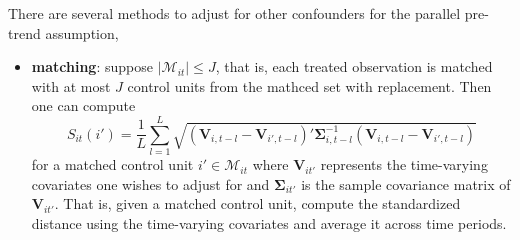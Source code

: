 \documentclass[twoside]{article}
\begin{document}
There are several methods to adjust for other confounders for the parallel pre-trend assumption,
\begin{itemize}
    \item \textbf{matching}: suppose $\left\vert \mathcal{M}_{it} \right\vert \leq J$, that is, each treated observation is matched with at most $J$ control units from the mathced set with replacement. Then one can compute
    \begin{equation*}
        S_{it}\left(i'\right) = \frac{1}{L} \sum^L_{l=1}\sqrt{ \left( \mathbf{V}_{i,t-l}-\mathbf{V}_{i',t-l}\right)'\boldsymbol{\Sigma}^{-1}_{i,t-l} \left( \mathbf{V}_{i,t-l}-\mathbf{V}_{i',t-l} \right) }
    \end{equation*}
    for a matched control unit $i'\in \mathcal{M}_{it}$ where $\mathbf{V}_{it'}$ represents the time-varying covariates one wishes to adjust for and $\boldsymbol{\Sigma}_{it'}$ is the sample covariance matrix of $\mathbf{V}_{it'}$. That is, given a matched control unit, compute the standardized distance using the time-varying covariates and average it across time periods.


\end{itemize}
\end{document}
